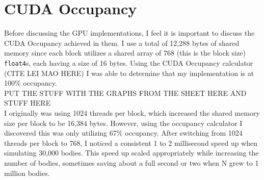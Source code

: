 \section{CUDA Occupancy}
Before discussing the GPU implementations, I feel it is important to discuss the CUDA Occupancy achieved in them. 
I use a total of 12,288 bytes of shared memory since each block utilizes a shared array of 
768 (this is the block size) \verb|float4|s, each having a size of 16 bytes. Using the CUDA Occupancy calculator (CITE LEI MAO HERE)
I was able to determine that my implementation is at 100\% occupancy. \\
PUT THE STUFF WITH THE GRAPHS FROM THE SHEET HERE AND STUFF HERE \\
\indent I originally was using 1024 threads per block, which increased the shared memory size per block to be 16,384 bytes. However, 
using the occupancy calculator I discovered this was only utilizing 67\% occupancy. After switching from 1024 threads per block
to 768, I noticed a consistent 1 to 2 millisecond speed up when simulating 30,000 bodies. This speed up scaled appropriately while increasing 
the number of bodies, sometimes saving about a full second or two when N grew to 1 million bodies.

